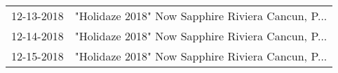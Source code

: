 \begin{supertabular}{ll}
 12-13-2018 &  "Holidaze 2018" Now Sapphire Riviera Cancun, P... \\
 12-14-2018 &  "Holidaze 2018" Now Sapphire Riviera Cancun, P... \\
 12-15-2018 &  "Holidaze 2018" Now Sapphire Riviera Cancun, P... \\
\end{supertabular}

